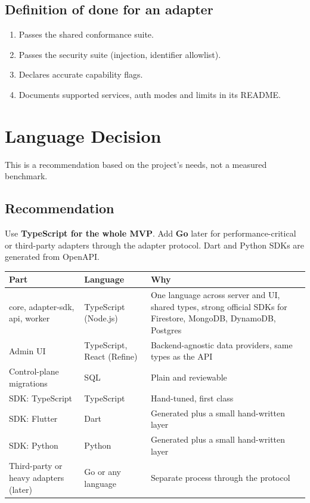 \documentclass[11pt,a4paper]{article}
\begin{document}
\subsection{Definition of done for an adapter}
\begin{enumerate}
  \item Passes the shared conformance suite.
  \item Passes the security suite (injection, identifier allowlist).
  \item Declares accurate capability flags.
  \item Documents supported services, auth modes and limits in its README.
\end{enumerate}

\section{Language Decision}
This is a recommendation based on the project's needs, not a measured benchmark.

\subsection{Recommendation}
Use \textbf{TypeScript for the whole MVP}. Add \textbf{Go} later for performance-critical or third-party adapters through the adapter protocol. Dart and Python SDKs are generated from OpenAPI.

\begin{tabularx}{\linewidth}{@{}>{\raggedright\arraybackslash}p{4.3cm}>{\raggedright\arraybackslash}p{3.3cm}X@{}}
\toprule
\textbf{Part} & \textbf{Language} & \textbf{Why}\\
\midrule
core, adapter-sdk, api, worker & TypeScript (Node.js) & One language across server and UI, shared types, strong official SDKs for Firestore, MongoDB, DynamoDB, Postgres\\
Admin UI & TypeScript, React (Refine) & Backend-agnostic data providers, same types as the API\\
Control-plane migrations & SQL & Plain and reviewable\\
SDK: TypeScript & TypeScript & Hand-tuned, first class\\
SDK: Flutter & Dart & Generated plus a small hand-written layer\\
SDK: Python & Python & Generated plus a small hand-written layer\\
Third-party or heavy adapters (later) & Go or any language & Separate process through the protocol\\
\bottomrule
\end{tabularx}\smallskip
\end{document}
